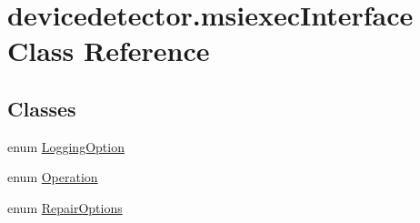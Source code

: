 \hypertarget{classdevicedetector_1_1msiexecInterface}{\section{devicedetector.\-msiexec\-Interface Class Reference}
\label{classdevicedetector_1_1msiexecInterface}
}
\subsection*{Classes}
\begin{DoxyCompactItemize}
\item 
enum \hyperlink{enumdevicedetector_1_1msiexecInterface_1_1LoggingOption}{Logging\-Option}
\item 
enum \hyperlink{enumdevicedetector_1_1msiexecInterface_1_1Operation}{Operation}
\item 
enum \hyperlink{enumdevicedetector_1_1msiexecInterface_1_1RepairOptions}{Repair\-Options}
\end{DoxyCompactItemize}

